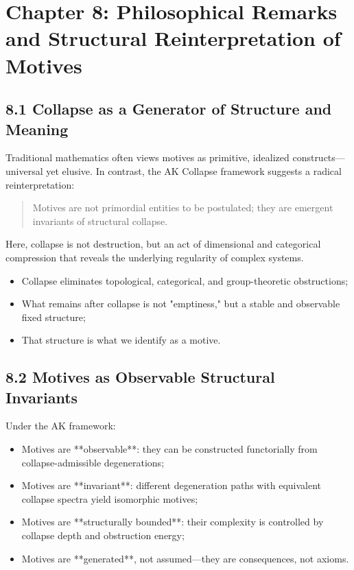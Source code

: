 \documentclass[11pt]{article}
\begin{document}

\section{Chapter 8: Philosophical Remarks and Structural Reinterpretation of Motives}

\subsection{8.1 Collapse as a Generator of Structure and Meaning}

Traditional mathematics often views motives as primitive, idealized constructs—universal yet elusive. In contrast, the AK Collapse framework suggests a radical reinterpretation:

\begin{quote}
Motives are not primordial entities to be postulated; they are emergent invariants of structural collapse.
\end{quote}

Here, collapse is not destruction, but an act of dimensional and categorical compression that reveals the underlying regularity of complex systems.

\begin{itemize}
    \item Collapse eliminates topological, categorical, and group-theoretic obstructions;
    \item What remains after collapse is not "emptiness," but a stable and observable fixed structure;
    \item That structure is what we identify as a motive.
\end{itemize}

\subsection{8.2 Motives as Observable Structural Invariants}

Under the AK framework:

\begin{itemize}
    \item Motives are **observable**: they can be constructed functorially from collapse-admissible degenerations;
    \item Motives are **invariant**: different degeneration paths with equivalent collapse spectra yield isomorphic motives;
    \item Motives are **structurally bounded**: their complexity is controlled by collapse depth and obstruction energy;
    \item Motives are **generated**, not assumed—they are consequences, not axioms.
\end{itemize}
\end{document}
